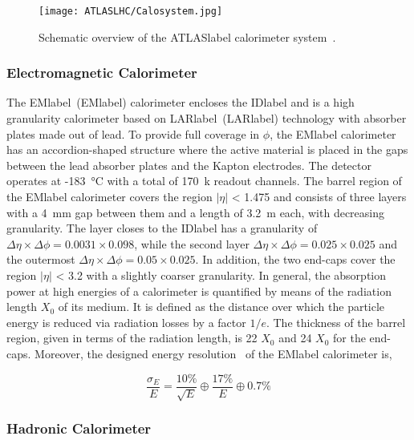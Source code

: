 \begin{figure}[htbp]
    \RawFloats
    \begin{center}
    \texttt{[image: ATLASLHC/Calosystem.jpg]}
    \caption{
        Schematic overview of the \acrshort{ATLASlabel} calorimeter system~\cite{Collaboration_2008}. 
    }
    \label{figLHC:ATLASCalo}
    \end{center}
\end{figure}

\subsubsection*{Electromagnetic Calorimeter}

The \acrlong{EMlabel}~(\acrshort{EMlabel}) calorimeter encloses the \acrshort{IDlabel} and is a high granularity calorimeter based on \acrlong{LARlabel}~(\acrshort{LARlabel}) technology with absorber plates made out of lead. To provide full coverage in $\phi$, the \acrshort{EMlabel} calorimeter has an accordion-shaped structure where the active material is placed in the gaps between the lead absorber plates and the Kapton electrodes. The detector operates at -183~°C with a total of 170~k readout channels. The barrel region of the \acrshort{EMlabel} calorimeter covers the region $|\eta|$ < 1.475 and consists of three layers with a 4~mm gap between them and a length of 3.2~m each, with decreasing granularity. The layer closes to the \acrshort{IDlabel} has a granularity of $\Delta\eta\times\Delta\phi= 0.0031\times 0.098$, while the second layer $\Delta\eta\times\Delta\phi= 0.025\times 0.025$ and the outermost $\Delta\eta\times\Delta\phi= 0.05\times 0.025$. In addition, the two end-caps cover the region $|\eta|$ < 3.2 with a slightly coarser granularity. In general, the absorption power at high energies of a calorimeter is quantified by means of the radiation length $X_0$ of its medium. It is defined as the distance over which the particle energy is reduced via radiation losses by a factor $1/e$. The thickness of the barrel region, given in terms of the radiation length, is 22 $X_0$ and 24 $X_0$ for the end-caps. Moreover, the designed energy resolution~\cite{Collaboration_2008} of the \acrshort{EMlabel} calorimeter is,

\begin{equation}
    \frac{\sigma_E}{E} = \frac{10\%}{\sqrt{E}}\oplus\frac{17\%}{E}\oplus 0.7\%
\end{equation}

\subsubsection*{Hadronic Calorimeter}


